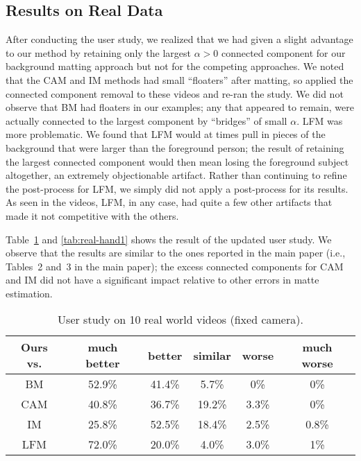\documentclass[10pt,twocolumn,letterpaper]{article}
\begin{document}
\subsection{Results on Real Data}

After conducting the user study, we realized that we had given a slight advantage to our method by retaining only the largest $\alpha > 0$ connected component for our background matting approach but not for the competing approaches.  We noted that the CAM and IM methods had small ``floaters'' after matting, so applied the connected component removal to these videos and re-ran the study.  We did not observe that BM had floaters in our examples; any that appeared to remain, were actually connected to the largest component by ``bridges'' of small $\alpha$.  LFM was more problematic. We found that LFM would at times pull in pieces of the background that were larger than the foreground person; the result of retaining the largest connected component would then mean losing the foreground subject altogether, an extremely objectionable artifact.  Rather than continuing to refine the post-process for LFM, we simply did not apply a post-process for its results.  As seen in the videos, LFM, in any case, had quite a few other artifacts that made it not competitive with the others.

Table~\ref{tab:real-fixed1} and \ref{tab:real-hand1} shows the result of the updated user study. We observe that the results are similar to the ones reported in the main paper (i.e., Tables~2 and~3 in the main paper); the excess connected components for CAM and IM did not have a significant impact relative to other errors in matte estimation. 



\begin{table}[!h]
\setlength\tabcolsep{2pt}
	\centering
\small
	\captionsetup{justification=centering}
\begin{tabular}{c|ccccc}
			\toprule
			 Ours vs. &  much better & better & similar & worse & much worse \\ 
			 \midrule
			 BM & 52.9\% & 41.4\% & 5.7\% & 0\% & 0\%\\
			 CAM & 40.8\% & 36.7\% & 19.2\% & 3.3\% & 0\%\\
			 IM & 25.8\% & 52.5\% & 18.4\% & 2.5\% & 0.8\%\\
			 LFM & 72.0\% & 20.0\% & 4.0\% & 3.0\% & 1\%\\
			\bottomrule
		\end{tabular}
		\vspace{0.5em}
		\caption{\small User study on 10 real world videos (fixed camera).}
	\vspace{-.5em}
	\label{tab:real-fixed1}
\end{table}
\end{document}
